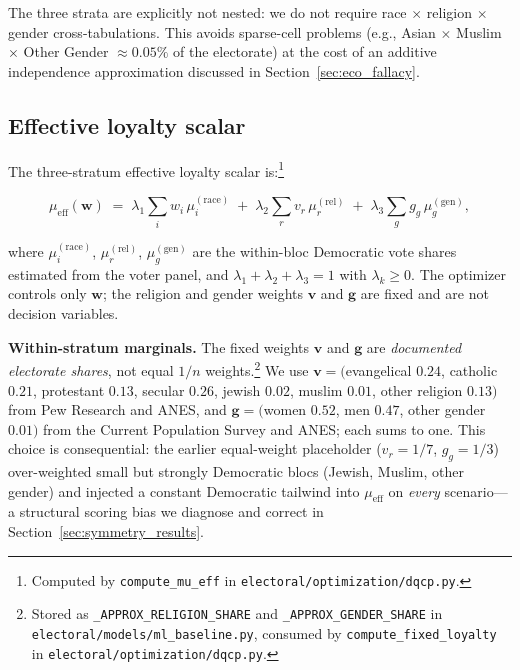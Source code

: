 \documentclass[12pt, letterpaper]{article}
\theoremstyle{definition}
\newcommand{\mueff}{\mu_{\mathrm{eff}}}
\newcommand{\lambdaone}{\lambda_1}
\newcommand{\lambdatwo}{\lambda_2}
\newcommand{\lambdathree}{\lambda_3}
\newcommand{\boldw}{\mathbf{w}}
\begin{document}
The three strata are explicitly not nested: we do not require race $\times$
religion $\times$ gender cross-tabulations. This avoids sparse-cell problems
(e.g., Asian $\times$ Muslim $\times$ Other Gender $\approx 0.05\%$ of the
electorate) at the cost of an additive independence approximation discussed
in Section~\ref{sec:eco_fallacy}.

\subsection{Effective loyalty scalar}
\label{sec:mueff}

The three-stratum effective loyalty scalar is:\footnote{Computed by
\texttt{compute\_mu\_eff} in \texttt{electoral/optimization/dqcp.py}.}

\begin{equation}
  \mueff(\boldw) \;=\;
    \lambdaone \sum_{i} w_i\, \mu_i^{(\text{race})}
  \;+\; \lambdatwo \sum_{r} v_r\, \mu_r^{(\text{rel})}
  \;+\; \lambdathree \sum_{g} g_g\, \mu_g^{(\text{gen})},
  \label{eq:mueff}
\end{equation}

where $\mu_i^{(\text{race})}$, $\mu_r^{(\text{rel})}$, $\mu_g^{(\text{gen})}$
are the within-bloc Democratic vote shares estimated from the voter panel, and
$\lambdaone + \lambdatwo + \lambdathree = 1$ with $\lambda_k \geq 0$. The
optimizer controls only $\boldw$; the religion and gender weights $\mathbf{v}$
and $\mathbf{g}$ are fixed and are not decision variables.

\textbf{Within-stratum marginals.} The fixed weights $\mathbf{v}$ and $\mathbf{g}$
are \emph{documented electorate shares}, not equal $1/n$
weights.\footnote{Stored as \texttt{\_APPROX\_RELIGION\_SHARE} and
\texttt{\_APPROX\_GENDER\_SHARE} in \texttt{electoral/models/ml\_baseline.py},
consumed by \texttt{compute\_fixed\_loyalty} in
\texttt{electoral/optimization/dqcp.py}.} We use
$\mathbf{v} = ($evangelical $0.24$, catholic $0.21$, protestant $0.13$, secular
$0.26$, jewish $0.02$, muslim $0.01$, other religion $0.13)$ from Pew Research and
ANES, and $\mathbf{g} = ($women $0.52$, men $0.47$, other gender $0.01)$ from the
Current Population Survey and ANES; each sums to one. This choice is consequential:
the earlier equal-weight placeholder ($v_r = 1/7$, $g_g = 1/3$) over-weighted small
but strongly Democratic blocs (Jewish, Muslim, other gender) and injected a constant
Democratic tailwind into $\mueff$ on \emph{every} scenario---a structural scoring bias
we diagnose and correct in Section~\ref{sec:symmetry_results}.
\end{document}
